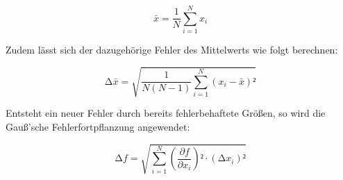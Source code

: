 \begin{equation}
\label{eqn:Mittelwert}
    \bar{x} = \frac{1}{N}\sum_{i=1}^N x_i
\end{equation}

\noindent Zudem lässt sich der dazugehörige Fehler des Mittelwerts wie folgt berechnen:

\begin{equation}
\label{eqn:Mittelwertfehler}
    \increment \bar{x} = \sqrt{\frac{1}{N\left(N-1\right)}\sum_{i=1}^N \left(x_i - \bar{x}\right)²}
\end{equation}

\noindent Entsteht ein neuer Fehler durch bereits fehlerbehaftete Größen, so wird die Gauß'sche Fehlerfortpflanzung angewendet:

\begin{equation}
\label{eqn:Fehlerfortpflanzung}
    \increment f = \sqrt{\sum_{i=1}^N \left(\frac{\partial f}{\partial x_i}\right)²\cdot\left(\increment x_i\right)²}
\end{equation}

